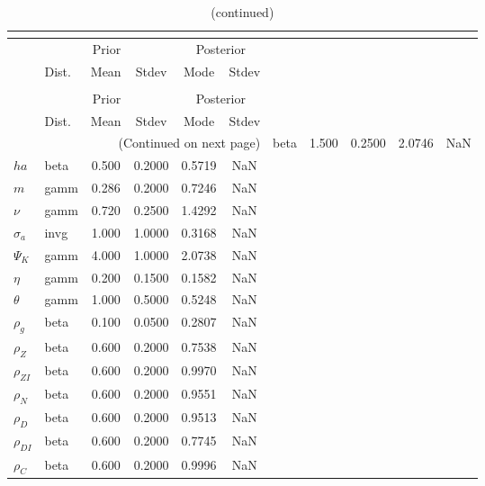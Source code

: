  
\begin{center}
\begin{longtable}{llcccc} 
\caption{Results from posterior maximization (parameters)}\\
 \label{Table:Posterior:1}\\
\toprule 
  & \multicolumn{3}{c}{Prior}  &  \multicolumn{2}{c}{Posterior} \\
  \cmidrule(r{.75em}){2-4} \cmidrule(r{.75em}){5-6}
  & Dist. & Mean  & Stdev & Mode & Stdev \\ 
\midrule \endfirsthead 
\caption{(continued)}\\
 \bottomrule 
  & \multicolumn{3}{c}{Prior}  &  \multicolumn{2}{c}{Posterior} \\
  \cmidrule(r{.75em}){2-4} \cmidrule(r{.75em}){5-6}
  & Dist. & Mean  & Stdev & Mode & Stdev \\ 
\midrule \endhead 
\bottomrule \multicolumn{6}{r}{(Continued on next page)}\endfoot 
\bottomrule\endlastfoot 
${\gamma}$ & beta &   1.500 & 0.2500 &   2.0746 &     NaN \\ 
${ha}$ & beta &   0.500 & 0.2000 &   0.5719 &     NaN \\ 
${m}$ & gamm &   0.286 & 0.2000 &   0.7246 &     NaN \\ 
$\nu$ & gamm &   0.720 & 0.2500 &   1.4292 &     NaN \\ 
${\sigma_a}$ & invg &   1.000 & 1.0000 &   0.3168 &     NaN \\ 
${\Psi_K}$ & gamm &   4.000 & 1.0000 &   2.0738 &     NaN \\ 
${\eta}$ & gamm &   0.200 & 0.1500 &   0.1582 &     NaN \\ 
${\theta}$ & gamm &   1.000 & 0.5000 &   0.5248 &     NaN \\ 
${\rho_g}$ & beta &   0.100 & 0.0500 &   0.2807 &     NaN \\ 
${\rho_Z}$ & beta &   0.600 & 0.2000 &   0.7538 &     NaN \\ 
${\rho_{ZI}}$ & beta &   0.600 & 0.2000 &   0.9970 &     NaN \\ 
${\rho_N}$ & beta &   0.600 & 0.2000 &   0.9551 &     NaN \\ 
${\rho_D}$ & beta &   0.600 & 0.2000 &   0.9513 &     NaN \\ 
${\rho_{DI}}$ & beta &   0.600 & 0.2000 &   0.7745 &     NaN \\ 
${\rho_C}$ & beta &   0.600 & 0.2000 &   0.9996 &     NaN \\ 
\end{longtable}
 \end{center}
